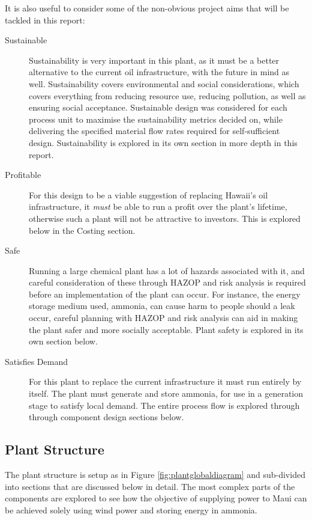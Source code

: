 It is also useful to consider some of the non-obvious project aims that will be tackled in this report:
\begin{description}
        \item[Sustainable]{Sustainability is very important in this plant, as it must be a better alternative to the current oil infrastructure, with the future in mind as well. Sustainability covers environmental and social considerations, which covers everything from reducing resource use, reducing pollution, as well as ensuring social acceptance. Sustainable design was considered for each process unit to maximise the sustainability metrics decided on, while delivering the specified material flow rates required for self-sufficient design. Sustainability is explored in its own section in more depth in this report.}
        \item[Profitable]{For this design to be a viable suggestion of replacing Hawaii's oil infrastructure, it \emph{must} be able to run a profit over the plant's lifetime, otherwise such a plant will not be attractive to investors. This is explored below in the Costing section.}
        \item[Safe]{Running a large chemical plant has a lot of hazards associated with it, and careful consideration of these through HAZOP and risk analysis is required before an implementation of the plant can occur. For instance, the energy storage medium used, ammonia, can cause harm to people should a leak occur, careful planning with HAZOP and risk analysis can aid in making the plant safer and more socially acceptable. Plant safety is explored in its own section below.}
        \item[Satisfies Demand]{For this plant to replace the current infrastructure it must run entirely by itself. The plant must generate and store ammonia, for use in a generation stage to satisfy local demand. The entire process flow is explored through through component design sections below. }
\end{description}

\subsection{Plant Structure}

The plant structure is setup as in Figure \ref{fig:plantglobaldiagram} and sub-divided into sections that are discussed below in detail.
The most complex parts of the components are explored to see how the objective of supplying power to Maui can be achieved solely using wind power and storing energy in ammonia.

